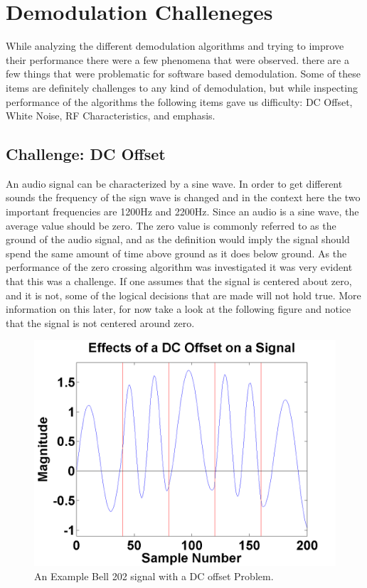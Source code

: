 \chapter{Demodulation Challeneges}
While analyzing the different demodulation algorithms and trying to improve their performance there were a few phenomena that were observed. there are a few things that were problematic for software based demodulation. Some of these items are definitely challenges to any kind of demodulation, but while inspecting performance of the algorithms the following items gave us difficulty: DC Offset, White Noise, RF Characteristics, and emphasis.

\section{Challenge: DC Offset}
An audio signal can be characterized by a sine wave. In order to get different sounds the frequency of the sign wave is changed and in the context here the two important frequencies are 1200Hz and 2200Hz. Since an audio is a sine wave, the average value should be zero. The zero value is commonly referred to as the ground of the audio signal, and as the definition would imply the signal should spend the same amount of time above ground as it does below ground. As the performance of the zero crossing algorithm was investigated it was very evident that this was a challenge. If one assumes that the signal is centered about zero, and it is not, some of the logical decisions that are made will not hold true. More information on this later, for now take a look at the following figure and notice that the signal is not centered around zero.
\begin{figure}
  \centering
	\includegraphics[width=0.75\linewidth]{images/EffectsofaDCOffsetonaSignal.png} 
	\caption{An Example Bell 202 signal with a DC offset Problem.}
\end{figure}

